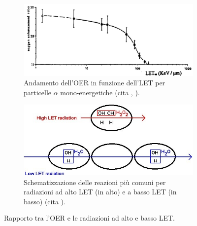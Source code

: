 \documentclass[12pt,a4paper,twoside]{report}
\begin{document}
	\begin{figure}[H]
		\centering
		\begin{subfigure}[t]{0.49\textwidth}
			\centering
			\includegraphics[width=\textwidth, scale=0.50]{images/let_rbe2.png}
			\caption{Andamento dell'OER in funzione dell'LET per particelle $\alpha$ mono-energetiche (cita
				,
				).}
			\label{fig:let_oer}
		\end{subfigure}
		\hfill
		\begin{subfigure}[t]{0.49\textwidth}
			\centering
			\includegraphics[width=\textwidth, scale=0.50]{images/reaction_let.jpg}
			\caption{Schematizzazione delle reazioni più comuni per radiazioni ad alto LET (in alto) e a basso LET (in basso) (cita
				).}
			\label{fig:reaction_let}
		\end{subfigure}
		\caption{Rapporto tra l'OER e le radiazioni ad alto e basso LET.}
	\end{figure}
		
\end{document}
